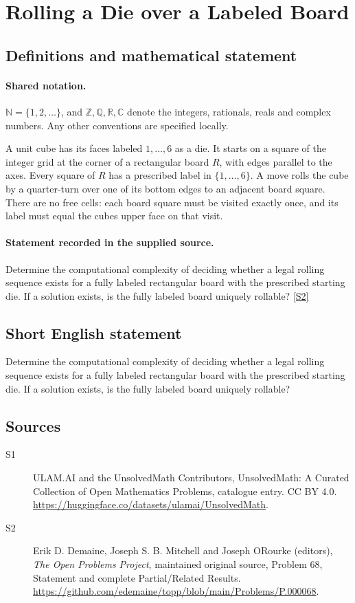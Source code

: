 \documentclass[11pt]{article}
\newcommand{\sref}[2]{\hyperlink{source:#1:#2}{[S#2]}}
\begin{document}
\section{Rolling a Die over a Labeled Board}\label{statement}

\subsection{Definitions and mathematical statement}

\paragraph{Shared notation.}$\mathbb N=\{1,2,\ldots\}$, and $\mathbb Z,\mathbb Q,\mathbb R,\mathbb C$ denote the integers, rationals, reals and complex numbers. Any other conventions are specified locally.


A unit cube has its faces labeled $1,\ldots,6$ as a die. It starts on a square of the integer grid at the corner of a rectangular board $R$, with edges parallel to the axes. Every square of $R$ has a prescribed label in $\{1,\ldots,6\}$. A move rolls the cube by a quarter-turn over one of its bottom edges to an adjacent board square. There are no free cells: each board square must be visited exactly once, and its label must equal the cube\textquotesingle s upper face on that visit.
\paragraph{Statement recorded in the supplied source.}
Determine the computational complexity of deciding whether a legal rolling sequence exists for a fully labeled rectangular board with the prescribed starting die. If a solution exists, is the fully labeled board uniquely rollable? \sref{statement}{2}
\subsection{Short English statement}
Determine the computational complexity of deciding whether a legal rolling sequence exists for a fully labeled rectangular board with the prescribed starting die. If a solution exists, is the fully labeled board uniquely rollable?
\subsection{Sources}
\begin{description}
\item[\hypertarget{source:statement:1}{S1}] ULAM.AI and the UnsolvedMath Contributors, UnsolvedMath: A Curated Collection of Open Mathematics Problems, catalogue entry. CC BY 4.0. \url{https://huggingface.co/datasets/ulamai/UnsolvedMath}.
\item[\hypertarget{source:statement:2}{S2}] Erik D. Demaine, Joseph S. B. Mitchell and Joseph O\textquotesingle Rourke (editors), \emph{The Open Problems Project}, maintained original source, Problem 68, Statement and complete Partial/Related Results. \url{https://github.com/edemaine/topp/blob/main/Problems/P.000068}.
\end{description}
\label{end:statement}
\end{document}
